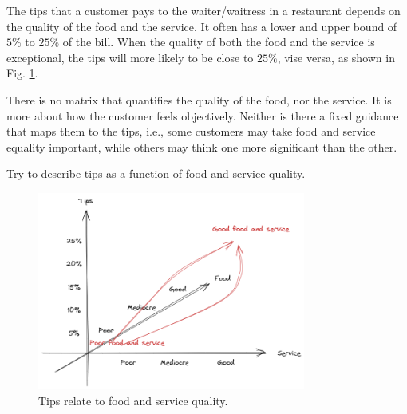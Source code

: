 \begin{shortbox}

The tips that a customer pays to the waiter/waitress in a restaurant depends on the quality of the food and the service. It often has a lower and upper bound of $5\%$ to $25\%$ of the bill. When the quality of both the food and the service is exceptional, the tips will more likely to be close to $25\%$, vise versa, as shown in Fig. \ref{ch:fcs:fig:expmotivating}.

There is no matrix that quantifies the quality of the food, nor the service. It is more about how the customer feels objectively. Neither is there a fixed guidance that maps them to the tips, i.e., some customers may take food and service equality important, while others may think one more significant than the other.

Try to describe tips as a function of food and service quality.

\end{shortbox}

\begin{figure}
	\centering
	\includegraphics[width=250pt]{chapters/ch-fuzzy-control-system/figures/expmotivating.png}
	\caption{Tips relate to food and service quality.} \label{ch:fcs:fig:expmotivating}
\end{figure}

